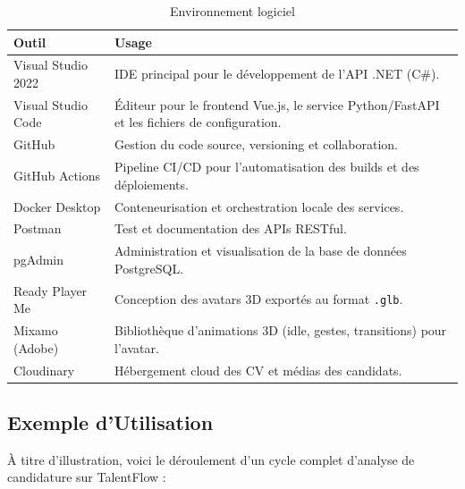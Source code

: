 \begin{table}[h]
\centering
\renewcommand{\arraystretch}{1.5}
\begin{tabular}{|p{4cm}|p{9cm}|}
\hline
\textbf{Outil} & \textbf{Usage} \\
\hline
Visual Studio 2022 & IDE principal pour le développement de l'API .NET (C\#). \\
\hline
Visual Studio Code & Éditeur pour le frontend Vue.js, le service Python/FastAPI et les fichiers de configuration. \\
\hline
GitHub & Gestion du code source, versioning et collaboration. \\
\hline
GitHub Actions & Pipeline CI/CD pour l'automatisation des builds et des déploiements. \\
\hline
Docker Desktop & Conteneurisation et orchestration locale des services. \\
\hline
Postman & Test et documentation des APIs RESTful. \\
\hline
pgAdmin & Administration et visualisation de la base de données PostgreSQL. \\
\hline
Ready Player Me & Conception des avatars 3D exportés au format \texttt{.glb}. \\
\hline
Mixamo (Adobe) & Bibliothèque d'animations 3D (idle, gestes, transitions) pour l'avatar. \\
\hline
Cloudinary & Hébergement cloud des CV et médias des candidats. \\
\hline
\end{tabular}
\caption{Environnement logiciel}
\label{tab:logiciel}
\end{table}

\subsection{Exemple d'Utilisation}

À titre d'illustration, voici le déroulement d'un cycle complet d'analyse de candidature
sur TalentFlow :

